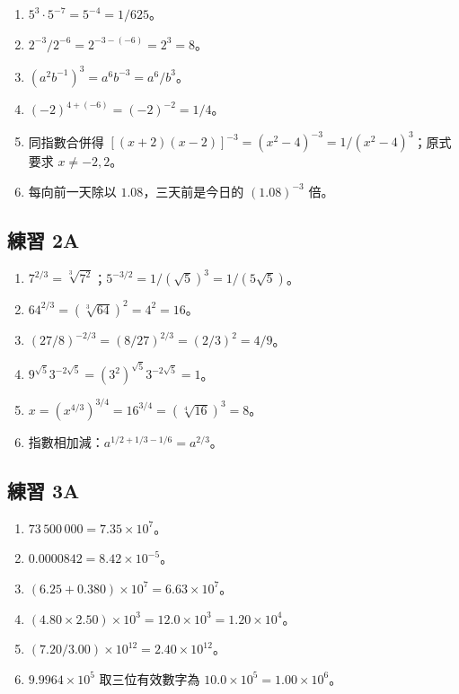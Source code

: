 \documentclass[11pt,a4paper]{article}
\providecommand{\tightlist}{%
  \setlength{\itemsep}{0pt}\setlength{\parskip}{0pt}}
\begin{document}
\begin{enumerate}
\def\labelenumi{\arabic{enumi}.}
\tightlist
\item
  \(5^3\cdot5^{-7}=5^{-4}=1/625\)。
\item
  \(2^{-3}/2^{-6}=2^{-3-(-6)}=2^3=8\)。
\item
  \((a^2b^{-1})^3=a^6b^{-3}=a^6/b^3\)。
\item
  \((-2)^{4+(-6)}=(-2)^{-2}=1/4\)。
\item
  同指數合併得 \([(x+2)(x-2)]^{-3}=(x^2-4)^{-3}=1/(x^2-4)^3\)；原式要求 \(x\ne-2,2\)。
\item
  每向前一天除以 \(1.08\)，三天前是今日的 \((1.08)^{-3}\) 倍。
\end{enumerate}

\subsection{練習 2A}\label{ux7df4ux7fd2-2a-1}

\begin{enumerate}
\def\labelenumi{\arabic{enumi}.}
\tightlist
\item
  \(7^{2/3}=\sqrt[3]{7^2}\)；\(5^{-3/2}=1/(\sqrt{5})^3=1/(5\sqrt{5})\)。
\item
  \(64^{2/3}=(\sqrt[3]{64})^2=4^2=16\)。
\item
  \((27/8)^{-2/3}=(8/27)^{2/3}=(2/3)^2=4/9\)。
\item
  \(9^{\sqrt{5}}3^{-2\sqrt{5}}=(3^2)^{\sqrt{5}}3^{-2\sqrt{5}}=1\)。
\item
  \(x=(x^{4/3})^{3/4}=16^{3/4}=(\sqrt[4]{16})^3=8\)。
\item
  指數相加減：\(a^{1/2+1/3-1/6}=a^{2/3}\)。
\end{enumerate}

\subsection{練習 3A}\label{ux7df4ux7fd2-3a-1}

\begin{enumerate}
\def\labelenumi{\arabic{enumi}.}
\tightlist
\item
  \(73\,500\,000=7.35\times10^7\)。
\item
  \(0.0000842=8.42\times10^{-5}\)。
\item
  \((6.25+0.380)\times10^7=6.63\times10^7\)。
\item
  \((4.80\times2.50)\times10^3=12.0\times10^3=1.20\times10^4\)。
\item
  \((7.20/3.00)\times10^{12}=2.40\times10^{12}\)。
\item
  \(9.9964\times10^5\) 取三位有效數字為 \(10.0\times10^5=1.00\times10^6\)。
\end{enumerate}
\end{document}
